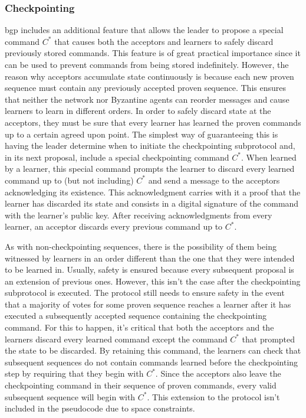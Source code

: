 \subsubsection{Checkpointing}  \acrshort{bgp} includes an additional feature that allows the leader to propose a special command $C^*$ that causes both the acceptors and learners to safely discard previously stored commands. This feature is of great practical importance since it can be used to prevent commands from being stored indefinitely. However, the reason why acceptors accumulate state continuously is because each new proven sequence must contain any previously accepted proven sequence. This ensures that neither the network nor Byzantine agents can reorder messages and cause learners to learn in different orders. In order to safely discard state at the acceptors, they must be sure that every learner has learned the proven commands up to a certain agreed upon point. The simplest way of guaranteeing this is having the leader determine when to initiate the checkpointing subprotocol and, in its next proposal, include a special checkpointing command $C^*$. When learned by a learner, this special command prompts the learner to discard every learned command up to (but not including) $C^*$ and send a message to the acceptors acknowledging its existence. This acknowledgment carries with it a proof that the learner has discarded its state and consists in a digital signature of the command with the learner's public key. After receiving acknowledgments from every learner, an acceptor discards every previous command up to $C^*$. \par
As with non-checkpointing sequences, there is the possibility of them being witnessed by learners in an order different than the one that they were intended to be learned in. Usually, safety is ensured because every subsequent proposal is an extension of previous ones. However, this isn't the case after the checkpointing subprotocol is executed. The protocol still needs to ensure safety in the event that a majority of votes for some proven sequence reaches a learner after it has executed a subsequently accepted sequence containing the checkpointing command. For this to happen, it's critical that both the acceptors and the learners discard every learned command except the command $C^*$ that prompted the state to be discarded. By retaining this command, the learners can check that subsequent sequences do not contain commands learned before the checkpointing step by requiring that they begin with $C^*$. Since the acceptors also leave the checkpointing command in their sequence of proven commands, every valid subsequent sequence will begin with $C^*$. This extension to the protocol isn't included in the pseudocode due to space constraints.

